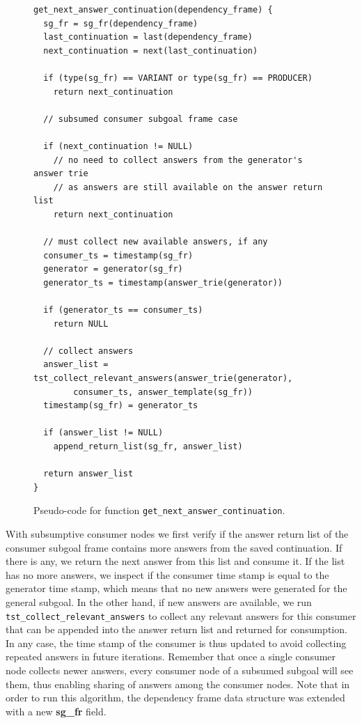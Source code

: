 \begin{figure}[ht]
\begin{Verbatim}
get_next_answer_continuation(dependency_frame) {
  sg_fr = sg_fr(dependency_frame)
  last_continuation = last(dependency_frame)
  next_continuation = next(last_continuation)
  
  if (type(sg_fr) == VARIANT or type(sg_fr) == PRODUCER)
    return next_continuation
  
  // subsumed consumer subgoal frame case
  
  if (next_continuation != NULL)
    // no need to collect answers from the generator's answer trie
    // as answers are still available on the answer return list
    return next_continuation
  
  // must collect new available answers, if any
  consumer_ts = timestamp(sg_fr)
  generator = generator(sg_fr)
  generator_ts = timestamp(answer_trie(generator))
      
  if (generator_ts == consumer_ts)
    return NULL
        
  // collect answers
  answer_list = tst_collect_relevant_answers(answer_trie(generator),
        consumer_ts, answer_template(sg_fr))
  timestamp(sg_fr) = generator_ts
      
  if (answer_list != NULL)
    append_return_list(sg_fr, answer_list)
      
  return answer_list
}
\end{Verbatim}
\caption{Pseudo-code for function \texttt{get\_next\_answer\_continuation}.}
\label{fig:get_next_answer_continuation}
\end{figure}

With subsumptive consumer nodes we first verify if the answer return list of the
consumer subgoal frame contains more answers from the saved continuation. If there is
any, we return the next answer from this list and consume it. If the list has no more answers,
we inspect if the consumer time stamp is equal to the generator time stamp, which means
that no new answers were generated for the general subgoal. In the other hand, if new
answers are available, we run \texttt{tst\_collect\_relevant\_answers} to collect any
relevant answers for this consumer that can be appended into the answer return list
and returned for consumption.
In any case, the time stamp of the consumer is thus updated to avoid collecting
repeated answers in future iterations. Remember that once a single consumer node
collects newer answers, every consumer node of a subsumed subgoal will see them, thus
enabling sharing of answers among the consumer nodes.
Note that in order to run this algorithm, the dependency frame data structure was extended
with a new \textbf{sg\_fr} field.


